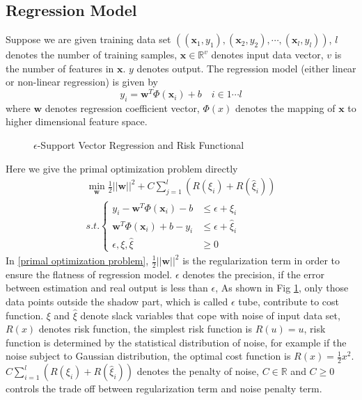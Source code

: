 \documentclass[12pt, draftclsnofoot, onecolumn]{IEEEtran}
\begin{document}
\begin{spacing}{2}
\subsection{Regression Model}
Suppose we are given training data set $((\mathbf{x}_{1}, y_{1}),(\mathbf{x}_{2},y_{2}),\cdots,(\mathbf{x}_{l},y_{l}))$, $l$ denotes the number of training samples, $\mathbf{x}\in \mathbb{R}^{v}$ denotes input data vector, $v$ is the number of features in $\mathbf{x}$. $y$ denotes output. The regression model (either linear or non-linear regression) is given by 
\begin{equation}
y_{i}=\mathbf{w}^{T}\Phi(\mathbf{x}_{i})+b  \quad i\in 1\cdots l 
\label{equation1}
\end{equation} 
where $\mathbf{w}$ denotes regression coefficient vector, $\Phi(x)$ denotes the mapping of $\mathbf{\mathbf{x}}$ to higher dimensional feature space.

\begin{figure}
\centering
\def\svgwidth{\columnwidth}

\caption{$\epsilon$-Support Vector Regression and Risk Functional}
\label{epsilon-SVR}
\end{figure}

Here we give the primal optimization problem directly
\begin{eqnarray}
\nonumber
\min_{\mathbf{w}} \frac{1}{2}||\mathbf{w}||^{2}+C\sum_{j=1}^{l}(R(\xi_{i})+R(\hat{\xi}_{i}))\\
s.t. \left\{\begin{array}{ll}
y_{i}-\mathbf{w}^{T}\Phi(\mathbf{x}_{i})-b &\leq \epsilon+\xi_{i}\\
\mathbf{w}^{T}\Phi(\mathbf{x}_{i})+b-y_{i} &\leq \epsilon+\hat{\xi}_{i}\\
\epsilon, \xi,\hat{\xi} &\geq 0
\end{array}\right.
\label{primal optimization problem}
\end{eqnarray}
In \ref{primal optimization problem}, $\frac{1}{2}||\mathbf{w}||^{2}$ is the regularization term in order to ensure the flatness of regression model. $\epsilon$ denotes the precision, if the error between estimation and real output is less than $\epsilon$, As shown in Fig \ref{epsilon-SVR}, only those data points outside the shadow part, which is called $\epsilon$ tube, contribute to cost function. $\xi$ and $\hat{\xi}$ denote slack variables that cope with noise of input data set, $R(x)$ denotes risk function, the simplest risk function is $R(u)=u$, risk function is determined by the statistical distribution of noise\cite{smola2004tutorial}, for example if the noise subject to Gaussian distribution, the optimal cost function is $R(x)=\frac{1}{2}x^{2}$. $C\sum_{i=1}^{l}(R(\xi_{i})+R(\hat{\xi}_{i}))$ denotes the penalty of noise, $C\in \mathbb{R}$ and $C\geq 0$ controls the trade off between regularization term and noise penalty term.

\end{spacing}
\end{document}
